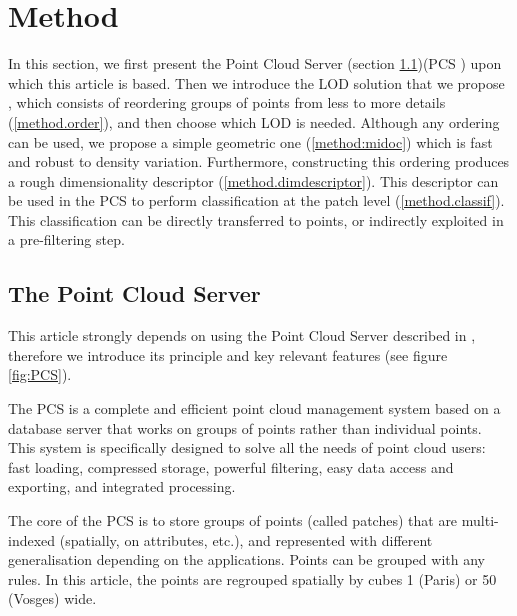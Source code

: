 

\section{Method}
	\label{sec:method}
	
	In this section, we first present the Point Cloud Server (section \ref{method.PCS})(PCS \cite{cura2015})
	upon which this article is based. Then we introduce the LOD solution that we propose 
	, which consists of reordering groups of points from less to more details (\ref{method.order}), and then choose which LOD is needed.
	Although any ordering can be used, we propose a simple geometric one (\ref{method:midoc}) which is fast and robust to density variation. 
	Furthermore, constructing this ordering produces a rough dimensionality descriptor (\ref{method.dimdescriptor}). 
	This descriptor can be used in the PCS to perform classification at the patch level (\ref{method.classif}). This classification can be directly transferred to points, or indirectly exploited in a pre-filtering step.
	
	\subsection{The Point Cloud Server}
	\label{method.PCS}
		
		This article strongly depends on using the Point Cloud Server described in \cite{cura2015},
		therefore we introduce its principle and key relevant features (see figure \ref{fig:PCS}).
		
		The PCS is a complete and efficient point cloud management system based on a database server that works on groups of points rather than individual points.
		This system is specifically designed to solve all the needs of point cloud users:
		fast loading, compressed storage, powerful filtering, easy data access and exporting, and integrated processing.
		
		The core of the PCS is to store groups of points (called patches) that are multi-indexed (spatially, on attributes, etc.), and represented with different generalisation depending on the applications.
		Points can be grouped with any rules.
		In this article, the points are regrouped spatially by cubes 1 \metre (Paris) or 50 \metre (Vosges) wide.
		
